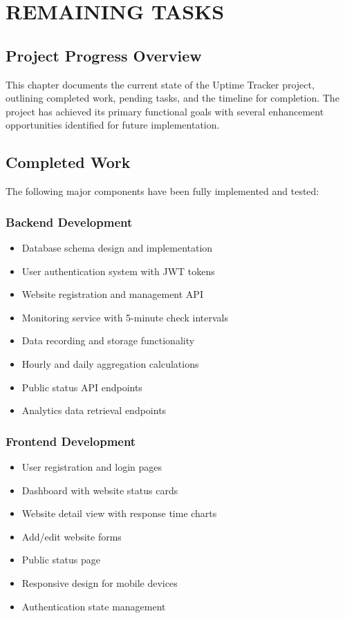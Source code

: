 \chapter{REMAINING TASKS}

\section{Project Progress Overview}

This chapter documents the current state of the Uptime Tracker project, outlining completed work, pending tasks, and the timeline for completion. The project has achieved its primary functional goals with several enhancement opportunities identified for future implementation.

\section{Completed Work}

The following major components have been fully implemented and tested:

\subsection{Backend Development}
\begin{itemize}
    \item[\checkmark] Database schema design and implementation
    \item[\checkmark] User authentication system with JWT tokens
    \item[\checkmark] Website registration and management API
    \item[\checkmark] Monitoring service with 5-minute check intervals
    \item[\checkmark] Data recording and storage functionality
    \item[\checkmark] Hourly and daily aggregation calculations
    \item[\checkmark] Public status API endpoints
    \item[\checkmark] Analytics data retrieval endpoints
\end{itemize}

\subsection{Frontend Development}
\begin{itemize}
    \item[\checkmark] User registration and login pages
    \item[\checkmark] Dashboard with website status cards
    \item[\checkmark] Website detail view with response time charts
    \item[\checkmark] Add/edit website forms
    \item[\checkmark] Public status page
    \item[\checkmark] Responsive design for mobile devices
    \item[\checkmark] Authentication state management
\end{itemize}

